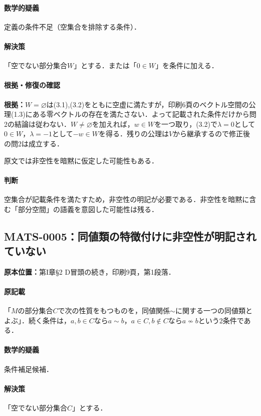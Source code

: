 \documentclass[a4paper,10pt]{ltjsarticle}
\begin{document}
\paragraph{数学的疑義}定義の条件不足（空集合を排除する条件）．

\paragraph{解決策}「空でない部分集合$W$」とする．または「$0\in W$」を条件に加える．

\paragraph{根拠・修復の確認}\textbf{根拠：}$W=\varnothing$は(3.1),(3.2)をともに空虚に満たすが，印刷6頁のベクトル空間の公理(1.3)にある零ベクトルの存在を満たさない．よって記載された条件だけから問2の結論は従わない．$W\ne\varnothing$を加えれば，$w\in W$を一つ取り，(3.2)で$\lambda=0$として$0\in W$，$\lambda=-1$として$-w\in W$を得る．残りの公理は$V$から継承するので修正後の問2は成立する．

原文では非空性を暗黙に仮定した可能性もある．

\paragraph{判断}空集合が記載条件を満たすため，非空性の明記が必要である．非空性を暗黙に含む「部分空間」の語義を意図した可能性は残る．


\subsection*{MATS-0005：同値類の特徴付けに非空性が明記されていない}\label{math:MATS-0005}
\noindent\textbf{原本位置：}第I章\S2 D冒頭の続き，印刷9頁，第1段落．

\paragraph{原記載}「$M$の部分集合$C$で次の性質をもつものを，同値関係$\sim$に関する一つの同値類とよぶ」．続く条件は，$a,b\in C$なら$a\sim b$，$a\in C,b\notin C$なら$a\not\sim b$という2条件である．

\paragraph{数学的疑義}条件補足候補．

\paragraph{解決策}「空でない部分集合$C$」とする．
\end{document}
